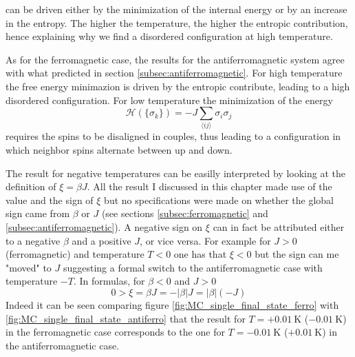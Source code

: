 can be driven either by the minimization of the internal energy or by an increase in the entropy. The higher the temperature, the higher the entropic contribution, hence explaining why 
we find a disordered configuration at high temperature. \par
\vspace{10pt}
As for the ferromagnetic case, the results for the antiferromagnetic system agree with what predicted in section \ref{subsec:antiferromagnetic}. For high temperature the free energy minimazion is driven by the entropic contribute, leading to a high disordered configuration. 
For low temperature the minimization of the energy 
\begin{equation*}
    \mathcal{H}(\{\sigma_k\}) = -J \sum_{\langle i j\rangle}\sigma_{i} \sigma_{j}
\end{equation*}
requires the spins to be disaligned in couples, thus leading to a configuration in which neighbor spins alternate between up and down. \par
\vspace{10pt}
The result for negative temperatures can be easilly interpreted by looking at the definition of $\xi = \beta J$. All the result I discussed in this chapter made use of the value and the sign of $\xi$ but no specifications were made on whether the global sign came from $\beta$ or $J$ (see sections \ref{subsec:ferromagnetic} and \ref{subsec:antiferromagnetic}). A negative sign on $\xi$ can in fact be attributed either to 
a negative $\beta$ and a positive $J$, or vice versa. For example for $J>0$ (ferromagnetic) and temperature $T<0$ one has that $\xi < 0$ but the sign can me "moved" to $J$ suggesting a formal switch to the antiferromagnetic case with temperature $-T$. In formulas, for $\beta < 0$ and $J > 0$
\begin{equation*}
    0 > \xi = \beta J = -|\beta| J = |\beta| (-J)
\end{equation*}
Indeed it can be seen comparing figure \ref{fig:MC_single_final_state_ferro} with \ref{fig:MC_single_final_state_antiferro} that the result for $T = +\SI{0.01}{\kelvin}$ ($-\SI{0.01}{\kelvin}$) in the ferromagnetic case corresponds to the one for $T = - \SI{0.01}{\kelvin}$ ($+\SI{0.01}{\kelvin}$) in the antiferromagnetic case.

